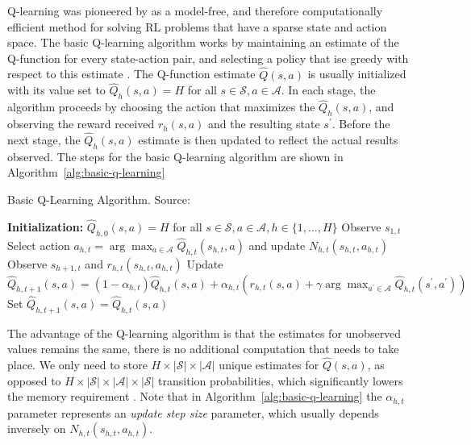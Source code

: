 \documentclass{mldsmsc}
\begin{document}
Q-learning was pioneered by \cite{RefWorks:watkins1989learning} as a model-free, and therefore
computationally efficient method for solving RL problems that have a sparse state
and action space. The basic Q-learning algorithm works by maintaining an estimate
of the Q-function for every state-action pair, and selecting a policy that
ise greedy with respect to this estimate \citep{pike-burke2024LearnigAgents}.
The Q-function estimate $\hat{Q}(s,a)$ is usually initialized with its value
set to $\hat{Q}_{h}(s,a) = H$ for all $s \in \mathcal{S}, a \in \mathcal{A}$.
In each stage, the algorithm proceeds by choosing the action that maximizes the
$\hat{Q}_{h}(s,a)$, and observing the reward received $r_h(s,a)$ and the
resulting state $s^\prime$. Before the next stage, the $\hat{Q}_{h}(s,a)$
estimate is then updated to reflect the actual results observed. The steps
for the basic Q-learning algorithm are shown in Algorithm~\ref{alg:basic-q-learning}

\begin{algorithm}
    \caption{Basic Q-Learning Algorithm. Source: \citep{pike-burke2024LearnigAgents}}\label{alg:basic-q-learning}
    \begin{algorithmic}[1]
        \State \textbf{Initialization:} $\hat{Q}_{h,0}(s,a) = H$ for all $s \in \mathcal{S}, a \in \mathcal{A}, h \in \{1, \ldots, H\}$
            \State Observe $s_{1,t}$
                \State Select action $a_{h,t} = \arg\max_{a \in \mathcal{A}}\hat{Q}_{h,t}(s_{h,t},a)$
                and update $N_{h,t}(s_{h,t}, a_{h,t})$
                \State Observe $s_{h+1, t}$ and $r_{h,t}(s_{h,t}, a_{h,t})$
                        \State Update $\hat{Q}_{h,t+1}(s,a) = (1- \alpha_{h,t})\hat{Q}_{h,t}(s,a) + \alpha_{h,t}(r_{h,t}(s, a) + \gamma \arg\max_{a^\prime \in \mathcal{A}}\hat{Q}_{h,t}(s^\prime,a^\prime))$
                    \Else
                        \State Set $\hat{Q}_{h,t+1}(s,a) = \hat{Q}_{h,t}(s,a)$
                    \EndIf
                    \EndFor
                \EndFor
            \EndFor
    \end{algorithmic}
\end{algorithm}

The advantage of the Q-learning algorithm is that the estimates for unobserved
values remains the same, there is no additional computation that needs to take place.
We only need to store $H \times |\mathcal{S}| \times |\mathcal{A}|$ unique estimates
for $\hat{Q}(s,a)$, as opposed to $H \times |\mathcal{S}| \times |\mathcal{A}| \times |\mathcal{S}|$
transition probabilities, which significantly lowers the memory requirement \citep{pike-burke2024LearnigAgents}.
Note that in Algorithm~\ref{alg:basic-q-learning} the $\alpha_{h,t}$ parameter represents an
\emph{update step size} parameter, which usually depends inversely on $N_{h,t}(s_{h,t}, a_{h,t})$.
\end{document}
